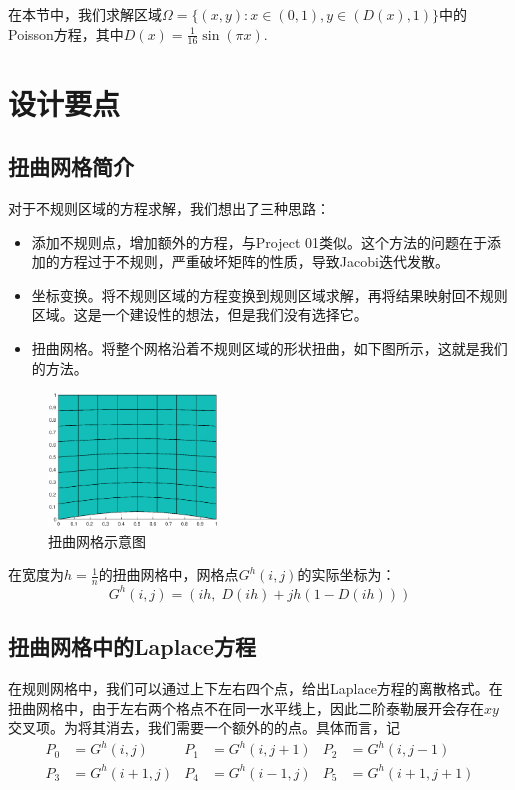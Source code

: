 \documentclass[lang=cn,10pt]{elegantbook}
\begin{document}
在本节中，我们求解区域$\Omega=\{(x,y):x\in(0,1),y\in(D(x),1)\}$中的Poisson方程，其中$D(x)=\frac{1}{16}\sin(\pi x).$

\section{设计要点}

\subsection{扭曲网格简介}

对于不规则区域的方程求解，我们想出了三种思路：

\begin{itemize}
  \item 添加不规则点，增加额外的方程，与Project 01类似。这个方法的问题在于添加的方程过于不规则，严重破坏矩阵的性质，导致Jacobi迭代发散。
  \item 坐标变换。将不规则区域的方程变换到规则区域求解，再将结果映射回不规则区域。这是一个建设性的想法，但是我们没有选择它。
  \item 扭曲网格。将整个网格沿着不规则区域的形状扭曲，如下图所示，这就是我们的方法。
\end{itemize}

\begin{figure}[H]
  \centering
  \includegraphics[width=0.4\textwidth]{figure/3-1.eps}
  \caption{扭曲网格示意图}
\end{figure}

在宽度为$h=\frac{1}{n}$的扭曲网格中，网格点$G^h(i,j)$的实际坐标为：
\begin{equation*}
  G^h(i,j)=(ih,\;D(ih)+jh(1-D(ih)))
\end{equation*}

\subsection{扭曲网格中的Laplace方程}

在规则网格中，我们可以通过上下左右四个点，给出Laplace方程的离散格式。在扭曲网格中，由于左右两个格点不在同一水平线上，因此二阶泰勒展开会存在$xy$交叉项。为将其消去，我们需要一个额外的的点。具体而言，记
\begin{align*}
  P_0&=G^h(i,j) & P_1&=G^h(i,j+1) & P_2&=G^h(i,j-1)\\
  P_3&=G^h(i+1,j) & P_4&=G^h(i-1,j) & P_5&=G^h(i+1,j+1)
\end{align*}
\end{document}
